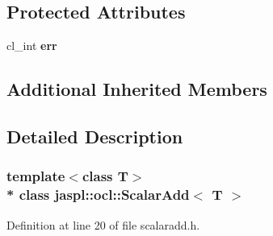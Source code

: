 \subsection*{Protected Attributes}
\begin{DoxyCompactItemize}
\item 
cl\+\_\+int {\bfseries err}\hypertarget{classjaspl_1_1ocl_1_1_scalar_add_ae5ba7922c0c238d804bc5b0e239c7d09}{}\label{classjaspl_1_1ocl_1_1_scalar_add_ae5ba7922c0c238d804bc5b0e239c7d09}

\end{DoxyCompactItemize}
\subsection*{Additional Inherited Members}


\subsection{Detailed Description}
\subsubsection*{template$<$class T$>$\\*
class jaspl\+::ocl\+::\+Scalar\+Add$<$ T $>$}



Definition at line 20 of file scalaradd.\+h.

